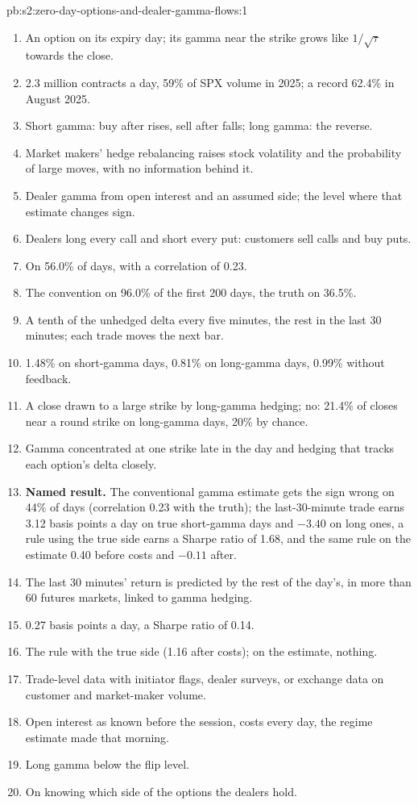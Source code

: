 \begin{solution}{pb:s2:zero-day-options-and-dealer-gamma-flows:1}
\begin{enumerate}
\item An option on its expiry day; its gamma near the strike grows like $1/\sqrt\tau$ towards the close.
\item 2.3 million contracts a day, 59\% of SPX volume in 2025; a record 62.4\% in August 2025.
\item Short gamma: buy after rises, sell after falls; long gamma: the reverse.
\item Market makers' hedge rebalancing raises stock volatility and the probability of large moves, with no information behind it.
\item Dealer gamma from open interest and an assumed side; the level where that estimate changes sign.
\item Dealers long every call and short every put: customers sell calls and buy puts.
\item On 56.0\% of days, with a correlation of 0.23.
\item The convention on 96.0\% of the first 200 days, the truth on 36.5\%.
\item A tenth of the unhedged delta every five minutes, the rest in the last 30 minutes; each trade moves the next bar.
\item 1.48\% on short-gamma days, 0.81\% on long-gamma days, 0.99\% without feedback.
\item A close drawn to a large strike by long-gamma hedging; no: 21.4\% of closes near a round strike on long-gamma days, 20\% by chance.
\item Gamma concentrated at one strike late in the day and hedging that tracks each option's delta closely.
\item \textbf{Named result.} The conventional gamma estimate gets the sign wrong on 44\% of days (correlation 0.23 with the truth); the
last-30-minute trade earns 3.12 basis points a day on true short-gamma days and $-3.40$ on long ones, a rule using the true side earns a Sharpe ratio
of 1.68, and the same rule on the estimate 0.40 before costs and $-0.11$ after.
\item The last 30 minutes' return is predicted by the rest of the day's, in more than 60 futures markets, linked to gamma hedging.
\item 0.27 basis points a day, a Sharpe ratio of 0.14.
\item The rule with the true side (1.16 after costs); on the estimate, nothing.
\item Trade-level data with initiator flags, dealer surveys, or exchange data on customer and market-maker volume.
\item Open interest as known before the session, costs every day, the regime estimate made that morning.
\item Long gamma below the flip level.
\item On knowing which side of the options the dealers hold.
\end{enumerate}
\end{solution}

